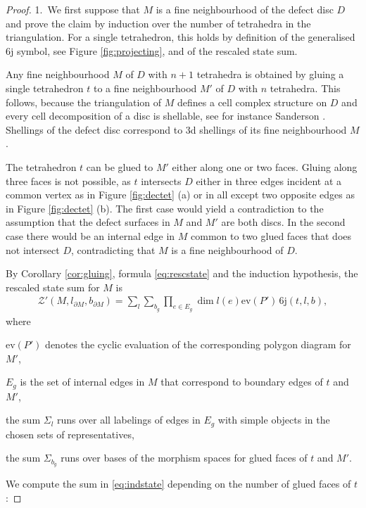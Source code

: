 \documentclass[1.5pt, a4paper]{article}
\newcommand{\ev}{\mathrm{ev}}
\begin{document}
\begin{proof}  
1.~We first suppose that $M$ is a fine neighbourhood of the defect disc $D$ and prove the claim by induction over the number of tetrahedra in the triangulation. For a single tetrahedron, this holds by definition of the generalised 6j symbol, see Figure \ref{fig:projecting}, and of the rescaled state sum. 

Any fine neighbourhood $M$ of $D$ with $n+1$ tetrahedra is obtained by gluing a single tetrahedron $t$ to a fine neighbourhood $M'$ of $D$ with $n$ tetrahedra.  
This follows, because  the triangulation of $M$ defines a cell complex structure on $D$ and 
 every cell decomposition of a disc is shellable, see for instance Sanderson \cite[Lemma 1]{S}. Shellings of the defect disc correspond to 3d shellings of its fine neighbourhood $M$.  
 
 The tetrahedron $t$ can be glued to $M'$ either along one or two faces. Gluing along three faces is not possible, as $t$ intersects $D$ either in three edges incident at a common vertex as in Figure \ref{fig:dectet} (a)  or in all except two opposite edges as in Figure \ref{fig:dectet} (b). The first case would yield a contradiction to the assumption that the defect surfaces in $M$ and $M'$ are both discs. In the second case there would be an internal  edge in $M$ common to two glued faces that does not intersect $D$, contradicting that
 $M$ is a fine neighbourhood of $D$.  
 
 
 
 By Corollary \ref{cor:gluing}, formula \eqref{eq:rescstate} and the induction hypothesis, the rescaled state sum for $M$ is
\begin{align}\label{eq:indstate}
\mathcal Z'(M, l_{\partial M}, b_{\partial M})
=\sum_{l}\sum_{b_g}
\prod_{e\in E_g} \dim l(e) \ev(P')\, \mathrm{6j}(t,l,b),
\end{align}
where 
\begin{compactitem}
\item $\ev(P')$ denotes the cyclic evaluation of the  corresponding polygon diagram for $M'$,  
\item $E_{g}$ is the set of internal edges in $M$ that correspond to boundary edges of $t$ and $M'$,
\item the sum $\Sigma_{l}$ runs over all labelings of edges in $E_g$ with simple objects in the chosen sets of representatives,
\item  the sum $\Sigma_{b_g}$ runs over bases of the morphism spaces for glued faces of $t$ and $M'$. 
\end{compactitem}
We compute the sum in \eqref{eq:indstate} depending on the number of glued faces of $t$:
 

\end{proof}
\end{document}
